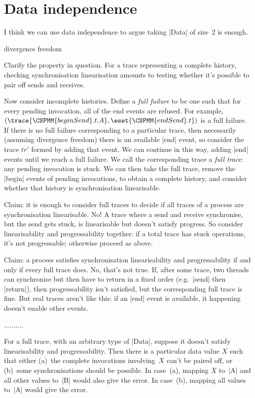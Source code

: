 \section{Data independence}


I think we can use data independence to argue taking |Data| of size~2 is
enough.  

divergence freedom

Clarify the property in question.  For a trace representing a complete
history, checking synchronisation linearisation amounts to testing whether
it's possible to pair off sends and receives.

Now consider incomplete histories.  Define a \emph{full failure} to be one
such that for every pending invocation, all of the end events are refused.
For example, $(\trace{\CSPMM{beginSend}.t.A}, \eset{\CSPMM{endSend}.t})$ is a
full failure.  If there is no full failure corresponding to a particular
trace, then necessarily (assuming divergence freedom) there is an available
|end| event, so consider the trace $tr'$ formed by adding that event.  We can
continue in this way, adding |end| events until we reach a full failure.  We
call the corresponding trace a \emph{full trace}: any pending invocation is
stuck.  We can then take the full trace, remove the |begin| events of pending
invocations, to obtain a complete history, and consider whether that history
is synchronisation linearisable.

Claim: it is enough to consider full traces to decide if all traces of a
process are synchronisation linearisable.  No!  A trace where a send and
receive synchronise, but the send gets stuck, is linearisable but doesn't
satisfy progress.  So consider linearisability and progressability together:
if a total trace has stuck operations, it's not progressable; otherwise
proceed as above. 

Claim: a process satisfies synchronisation linearisability and progressability
if and only if every full trace does.  No, that's not true.  If, after some
trace, two threads can synchronise but then have to return in a fixed order
(e.g.~|send| then |return|), then progressability isn't satisfied, but the
corresponding full trace is fine.  But real traces aren't like this: if an
|end| event is available, it happening doesn't enable other events.

..........

For a full trace, with an arbitrary type of |Data|, suppose it doesn't satisfy
linearisability and progressability.  Then there is a particular data value
$X$ such that either (a)~the complete invocations involving~$X$ can't be paired
off, or (b)~some synchronisations should be possible.  In case~(a), mapping
$X$ to~|A| and all other values to~|B| would also give the error.  In
case~(b), mapping all values to~|A| would give the error.   





